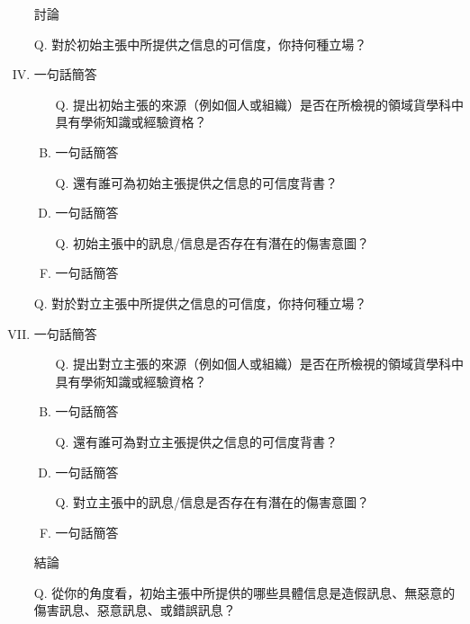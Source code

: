 \documentclass[a4paper, 12pt]{article}
\begin{document}
\begin{enumerate}[I.]
        \item [] %
        \item [] 討論
        \item [Q.] 對於{\color{blue}初始主張}中所提供之信息的可信度，你持何種立場？
        \item {\color{gray}一句話簡答} %
            \begin{enumerate}[A.]
                \item [Q.]提出{\color{blue}初始主張}的來源（例如個人或組織）是否在所檢視的領域貨學科中具有學術知識或經驗資格？
                \item {\color{gray}一句話簡答} %
                \item [Q.]還有誰可為{\color{blue}初始主張}提供之信息的可信度背書？
                \item {\color{gray}一句話簡答}
                \item [Q.]{\color{blue}初始主張}中的訊息/信息是否存在有潛在的傷害意圖？
                \item {\color{gray}一句話簡答}
            \end{enumerate}
        \item []
        \item [Q.] 對於{\color{red}對立主張}中所提供之信息的可信度，你持何種立場？
        \item {\color{gray}一句話簡答} %
            \begin{enumerate}[A.]
                \item [Q.]提出{\color{red}對立主張}的來源（例如個人或組織）是否在所檢視的領域貨學科中具有學術知識或經驗資格？
                \item {\color{gray}一句話簡答} %
                \item [Q.]還有誰可為{\color{red}對立主張}提供之信息的可信度背書？
                \item {\color{gray}一句話簡答}
                \item [Q.]{\color{red}對立主張}中的訊息/信息是否存在有潛在的傷害意圖？
                \item {\color{gray}一句話簡答}
            \end{enumerate}
        \item [] %
        \item [] 結論
        \item [Q.] 從你的角度看，{\color{blue}初始主張}中所提供的哪些具體信息是造假訊息、無惡意的傷害訊息、惡意訊息、或錯誤訊息？

\end{enumerate}
\end{document}
